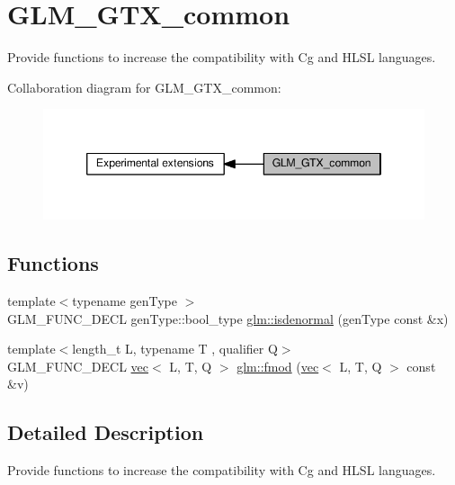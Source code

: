 \hypertarget{group__gtx__common}{}\section{G\+L\+M\+\_\+\+G\+T\+X\+\_\+common}
\label{group__gtx__common}


Provide functions to increase the compatibility with Cg and H\+L\+SL languages.  


Collaboration diagram for G\+L\+M\+\_\+\+G\+T\+X\+\_\+common\+:
\nopagebreak
\begin{figure}[H]
\begin{center}
\leavevmode
\includegraphics[width=346pt]{d6/dd9/group__gtx__common}
\end{center}
\end{figure}
\subsection*{Functions}
\begin{DoxyCompactItemize}
\item 
{\footnotesize template$<$typename gen\+Type $>$ }\\G\+L\+M\+\_\+\+F\+U\+N\+C\+\_\+\+D\+E\+CL gen\+Type\+::bool\+\_\+type \hyperlink{group__gtx__common_ga74aa7c7462245d83bd5a9edf9c6c2d91}{glm\+::isdenormal} (gen\+Type const \&x)
\item 
{\footnotesize template$<$length\+\_\+t L, typename T , qualifier Q$>$ }\\G\+L\+M\+\_\+\+F\+U\+N\+C\+\_\+\+D\+E\+CL \hyperlink{structglm_1_1vec}{vec}$<$ L, T, Q $>$ \hyperlink{group__gtx__common_gae5e80425df9833164ad469e83b475fb4}{glm\+::fmod} (\hyperlink{structglm_1_1vec}{vec}$<$ L, T, Q $>$ const \&v)
\end{DoxyCompactItemize}


\subsection{Detailed Description}
Provide functions to increase the compatibility with Cg and H\+L\+SL languages. 

